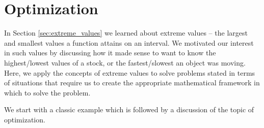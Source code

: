 \ifcalculus
\section{Optimization}\label{sec:optimization}

In Section \ref{sec:extreme_values} we learned about extreme values -- the largest and smallest values a function attains on an interval. We motivated our interest in such values by discussing how it made sense to want to know the highest/lowest values of a stock, or the fastest/slowest an object was moving. Here, we apply the concepts of extreme values to solve  problems stated in terms of situations that require us to create the appropriate mathematical framework in which to solve the problem.


We start with a classic example which is followed by a discussion of the topic of optimization.

